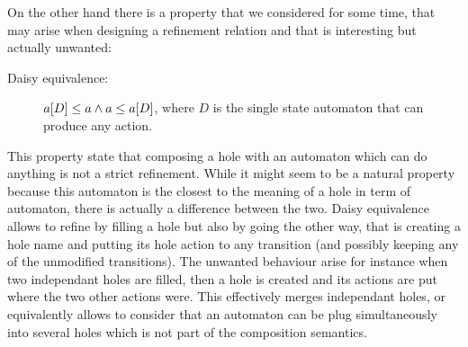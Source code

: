 \documentclass{article}
\begin{document}
On the other hand there is a property that we considered for some time, that may arise when designing a refinement relation and that is interesting but actually unwanted:
\begin{description}
\item[Daisy equivalence:] \(a{\left[D\right]} \leq a \wedge a \leq a{\left[D\right]}\), where \(D\) is the single state automaton that can produce any action. %
\end{description}
This property state that composing a hole with an automaton which can do anything is not a strict refinement.
While it might seem to be a natural property because this automaton is the closest to the meaning of a hole in term of automaton, there is actually a difference between the two.
Daisy equivalence allows to refine by filling a hole but also by going the other way, that is creating a hole name and putting its hole action to any transition (and possibly keeping any of the unmodified transitions).
The unwanted behaviour arise for instance when two independant holes are filled, then a hole is created and its actions are put where the two other actions were.
This effectively merges independant holes, or equivalently allows to consider that an automaton can be plug simultaneously into several holes which is not part of the composition semantics.
\begin{exi}
\end{exi}
\end{document}
